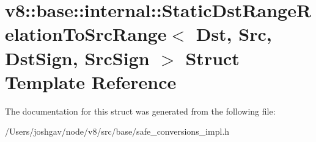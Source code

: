 \hypertarget{structv8_1_1base_1_1internal_1_1_static_dst_range_relation_to_src_range}{}\section{v8\+:\+:base\+:\+:internal\+:\+:Static\+Dst\+Range\+Relation\+To\+Src\+Range$<$ Dst, Src, Dst\+Sign, Src\+Sign $>$ Struct Template Reference}
\label{structv8_1_1base_1_1internal_1_1_static_dst_range_relation_to_src_range}


The documentation for this struct was generated from the following file\+:\begin{DoxyCompactItemize}
\item 
/\+Users/joshgav/node/v8/src/base/safe\+\_\+conversions\+\_\+impl.\+h\end{DoxyCompactItemize}
